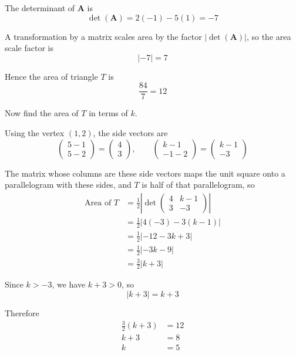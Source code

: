 \documentclass[leqno]{article}
\begin{document}
\begin{enumerate}[
  label=\textbf{\arabic*.},
  leftmargin=*,
  topsep=0pt,
  partopsep=0pt,
  parsep=0pt
]
\begin{djsSolution}
\begin{enumerate}[label=\textbf{(\roman*)}]
  The determinant of $\mathbf{A}$ is
  \[
  \det(\mathbf{A})=2(-1)-5(1)=-7
  \]

  A transformation by a matrix scales area by the factor $|\det(\mathbf{A})|$, so the area scale factor is
  \[
  |-7|=7
  \]

  Hence the area of triangle $T$ is
  \[
  \frac{84}{7}=12
  \]

  Now find the area of $T$ in terms of $k$.

  Using the vertex $(1,2)$, the side vectors are
  \[
  \begin{pmatrix}5-1\\5-2\end{pmatrix}
  =
  \begin{pmatrix}4\\3\end{pmatrix},
  \qquad
  \begin{pmatrix}k-1\\-1-2\end{pmatrix}
  =
  \begin{pmatrix}k-1\\-3\end{pmatrix}
  \]

  The matrix whose columns are these side vectors maps the unit square onto a parallelogram with these sides, and $T$ is half of that parallelogram, so
  \begin{align*}
  \text{Area of }T
  &=\frac12\left|\det
  \begin{pmatrix}
  4 & k-1\\
  3 & -3
  \end{pmatrix}
  \right|\\
  &=\frac12|4(-3)-3(k-1)|\\
  &=\frac12|-12-3k+3|\\
  &=\frac12|-3k-9|\\
  &=\frac32|k+3|
  \end{align*}

  Since $k>-3$, we have $k+3>0$, so
  \[
  |k+3|=k+3
  \]

  Therefore
  \begin{align*}
  \frac32(k+3)&=12\\
  k+3&=8\\
  k&=5
  \end{align*}
\end{enumerate}
\end{djsSolution}


\newpage

\questionitem


\end{enumerate}
\end{document}
